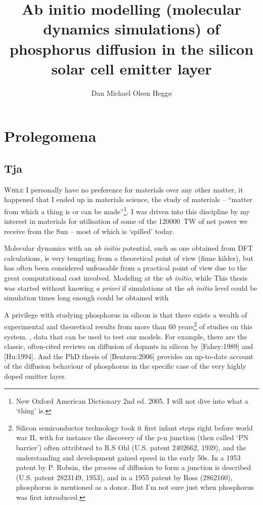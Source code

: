 \documentclass[11pt]{scrbook}   %
\title{Ab initio modelling (molecular dynamics simulations) of phosphorus diffusion in the silicon solar cell emitter layer}
\author{Dan Michael Olsen Heggø}
\begin{document}
\frontmatter
\maketitle

\tableofcontents

\mainmatter

\chapter{Prolegomena}

\section{Tja}

\lettrine[lines=3, findent=.2em, slope=-0.5em, nindent=0pt]{W}{hile}
I personally have no preference for materials over any other matter,
it happened that I ended up in materials science, the study of materials 
-- ``matter from which a thing is or can be made''\footnote{New Oxford American Dictionary 2nd ed. 2005. I will not 
dive into what a `thing' is.}. I was driven into this discipline by my
interest in materials for utilisation of some of the \SI{120000}{\tera\watt}
of net power we receive from the Sun -- most of which is `spilled' today. 

Molecular dynamics with an \textit{ab initio} potential, such as one obtained from DFT calculations, is very tempting from a theoretical point of view (finne kilder), but has often been considered unfeasable from a practical point of view due to the great computational cost involved.
Modeling at the \textit{ab initio}, while 
This thesis was started without knowing \textit{a priori} if simulations at the \textit{ab initio} level could be 
simulation times long enough could be obtained with 


A privilege with studying phosphorus in silicon is that there exists a wealth of experimental and theoretical results from more 
than 60 years\footnote{
  Silicon semiconductor technology took it first infant steps right before world war II, with for instance
  the discovery of the p-n junction (then called `PN barrier') often attribtued to R.S Ohl (U.S. patent 2402662, 1939),
  and the understanding and development gained speed in the early 50s. In a 1953 patent by P. Robsin, the process of 
  diffusion to form a junction is described (U.S. patent 2823149, 1953), and in a 1955 patent by Ross (2862160), 
  phosphorus is mentioned as a donor. But I'm not sure just when phosphorus was first introduced.
} of studies on this system. 
, data that can be used to test our models. 
For example, there are the classic, often-cited reviews on diffusion of dopants in silicon by [Fahey:1989] and [Hu:1994]. And the PhD thesis of [Bentzen:2006] provides an up-to-date account of the diffusion behaviour of phosphorus in the specific case of the very highly doped emitter layer.
\end{document}
